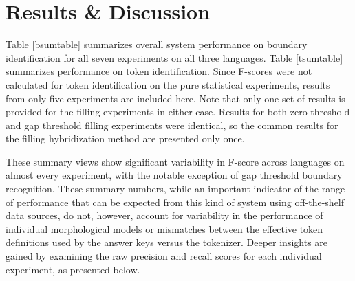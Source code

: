 \chapter{Results \& Discussion}
\FloatBarrier

Table \ref{bsumtable} summarizes overall system performance on boundary identification for all seven experiments on all three languages. Table \ref{tsumtable} summarizes performance on token identification. Since F-scores were not calculated for token identification on the pure statistical experiments, results from only five experiments are included here. Note that only one set of results is provided for the filling experiments in either case. Results for both zero threshold and gap threshold filling experiments were identical, so the common results for the filling hybridization method are presented only once.

These summary views show significant variability in F-score across languages on almost every experiment, with the notable exception of gap threshold boundary recognition. These summary numbers, while an important indicator of the range of performance that can be expected from this kind of system using off-the-shelf data sources, do not, however, account for variability in the performance of individual morphological models or mismatches between the effective token definitions used by the answer keys versus the tokenizer. Deeper insights are gained by examining the raw precision and recall scores for each individual experiment, as presented below.

